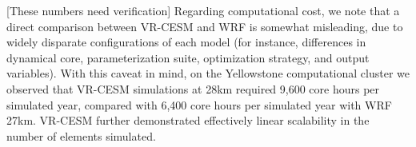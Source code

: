 \documentclass[draft,ms]{agutex}   %
\begin{document}
\begin{article}
{\color{red}[These numbers need verification] Regarding computational cost, we note that a direct comparison between VR-CESM and WRF is somewhat misleading, due to widely disparate configurations of each model (for instance, differences in dynamical core, parameterization suite, optimization strategy, and output variables).  With this caveat in mind, on the Yellowstone computational cluster we observed that VR-CESM simulations at 28km required 9,600 core hours per simulated year, compared with 6,400 core hours per simulated year with WRF 27km.  VR-CESM further demonstrated effectively linear scalability in the number of elements simulated.}



\end{article}
\end{document}
